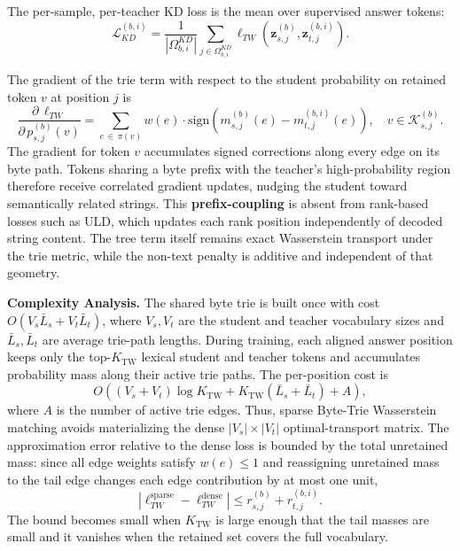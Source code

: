 The per-sample, per-teacher KD loss is the mean over supervised answer
tokens:
\begin{equation}
\mathcal{L}_{KD}^{(b,i)}
=
\frac{1}{|\Omega_{b,i}^{KD}|}
\sum_{j\in\Omega_{b,i}^{KD}}
\ell_{TW}\!\left(\mathbf{z}_{s,j}^{(b)},\mathbf{z}_{t,j}^{(b,i)}\right).
\label{eq:per_teacher_tw}
\end{equation}

The gradient of the trie term with respect to the student probability on
retained token \(v\) at position \(j\) is
\begin{equation}
\frac{\partial\,\ell_{TW}}{\partial\,p_{s,j}^{(b)}(v)}
=
\sum_{e\,\in\,\pi(v)}
w(e)\cdot\mathrm{sign}\!\left(m_{s,j}^{(b)}(e)-m_{t,j}^{(b,i)}(e)\right),
\quad v\in\mathcal{K}_{s,j}^{(b)}.
\label{eq:tw-gradient}
\end{equation}
The gradient for token \(v\) accumulates signed corrections along every edge
on its byte path. Tokens sharing a byte prefix with the teacher's
high-probability region therefore receive correlated gradient updates, nudging
the student toward semantically related strings. This \textbf{prefix-coupling} is
absent from rank-based losses such as ULD, which updates each rank position
independently of decoded string content. The tree term itself remains exact
Wasserstein transport under the trie metric, while the non-text penalty is
additive and independent of that geometry.

\textbf{Complexity Analysis.}
The shared byte trie is built once with cost
\(O(V_s\bar{L}_s + V_t\bar{L}_t)\), where \(V_s,V_t\) are the student and
teacher vocabulary sizes and \(\bar{L}_s,\bar{L}_t\) are average trie-path
lengths. During training, each aligned answer position keeps only the
top-\(K_{\mathrm{TW}}\) lexical student and teacher tokens and accumulates
probability mass along their active trie paths. The per-position cost is
\[
O\!\left((V_s+V_t)\log K_{\mathrm{TW}}
+ K_{\mathrm{TW}}(\bar{L}_s+\bar{L}_t) + A\right),
\]
where \(A\) is the number of active trie edges. Thus, sparse Byte-Trie Wasserstein
matching avoids materializing the dense \(|V_s|\times |V_t|\) optimal-transport
matrix. The approximation error relative to the dense loss is bounded by the
total unretained mass: since all edge weights satisfy \(w(e)\le 1\) and
reassigning unretained mass to the tail edge changes each edge contribution by
at most one unit,
\begin{equation}
\left|\ell_{TW}^{\mathrm{sparse}}-\ell_{TW}^{\mathrm{dense}}\right|
\le
r_{s,j}^{(b)}+r_{t,j}^{(b,i)}.
\label{eq:tw-sparse-error}
\end{equation}
The bound becomes small when \(K_{\mathrm{TW}}\) is large enough that the tail
masses are small and it vanishes when the retained set covers the full
vocabulary.

